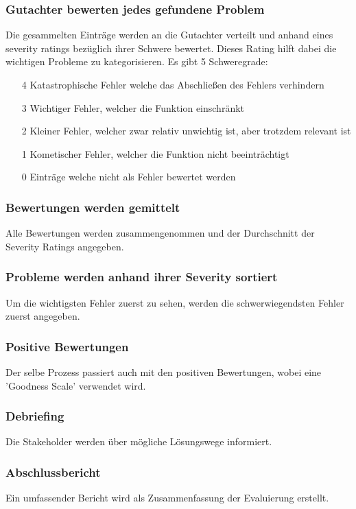 \documentclass{article}
\begin{document}
	\subsubsection{Gutachter bewerten jedes gefundene Problem}
	Die gesammelten Einträge werden an die Gutachter verteilt und anhand eines severity ratings bezüglich ihrer Schwere bewertet. Dieses Rating hilft dabei die wichtigen Probleme zu kategorisieren. Es gibt 5 Schweregrade:
	\begin{enumerate}
		\item[4]{Katastrophische Fehler welche das Abschließen des Fehlers verhindern}
		\item[3]{Wichtiger Fehler, welcher die Funktion einschränkt}
		\item[2]{Kleiner Fehler, welcher zwar relativ unwichtig ist, aber trotzdem relevant ist}
		\item[1]{Kometischer Fehler, welcher die Funktion nicht beeinträchtigt}
		\item[0]{Einträge welche nicht als Fehler bewertet werden}
	\end{enumerate}
	\subsubsection{Bewertungen werden gemittelt}
	Alle Bewertungen werden zusammengenommen und der Durchschnitt der Severity Ratings angegeben.
	\subsubsection{Probleme werden anhand ihrer Severity sortiert}
	Um die wichtigsten Fehler zuerst zu sehen, werden die schwerwiegendsten Fehler zuerst angegeben.
	\subsubsection{Positive Bewertungen}
	Der selbe Prozess passiert auch mit den positiven Bewertungen, wobei eine 'Goodness Scale' verwendet wird.
	\subsubsection{Debriefing}
	Die Stakeholder werden über mögliche Lösungswege informiert.
	\subsubsection{Abschlussbericht}
	Ein umfassender Bericht wird als Zusammenfassung der Evaluierung erstellt.



















  
\end{document}
